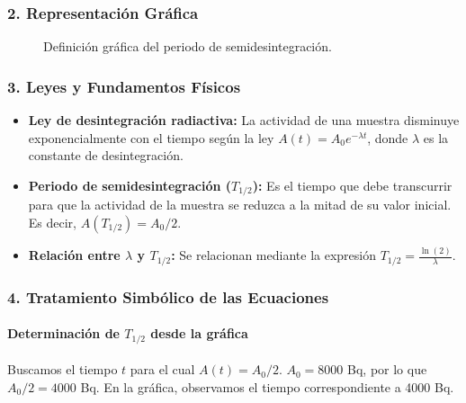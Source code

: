 \subsubsection*{2. Representación Gráfica}
\begin{figure}[H]
    \centering
    \caption{Definición gráfica del periodo de semidesintegración.}
\end{figure}

\subsubsection*{3. Leyes y Fundamentos Físicos}
\begin{itemize}
    \item \textbf{Ley de desintegración radiactiva:} La actividad de una muestra disminuye exponencialmente con el tiempo según la ley $A(t) = A_0 e^{-\lambda t}$, donde $\lambda$ es la constante de desintegración.
    \item \textbf{Periodo de semidesintegración ($T_{1/2}$):} Es el tiempo que debe transcurrir para que la actividad de la muestra se reduzca a la mitad de su valor inicial. Es decir, $A(T_{1/2}) = A_0/2$.
    \item \textbf{Relación entre $\lambda$ y $T_{1/2}$:} Se relacionan mediante la expresión $T_{1/2} = \frac{\ln(2)}{\lambda}$.
\end{itemize}

\subsubsection*{4. Tratamiento Simbólico de las Ecuaciones}
\paragraph*{Determinación de $T_{1/2}$ desde la gráfica}
Buscamos el tiempo $t$ para el cual $A(t) = A_0/2$.
$A_0 = 8000$ Bq, por lo que $A_0/2 = 4000$ Bq. En la gráfica, observamos el tiempo correspondiente a 4000 Bq.

